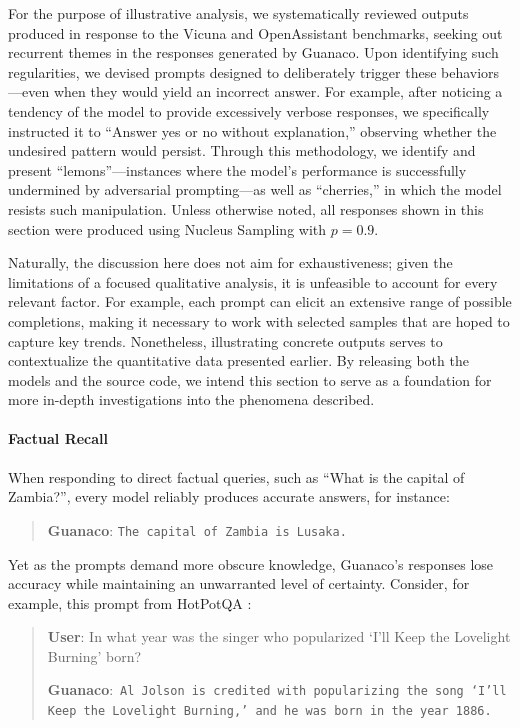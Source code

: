 For the purpose of illustrative analysis, we systematically reviewed outputs produced in response to the Vicuna and OpenAssistant benchmarks, seeking out recurrent themes in the responses generated by {Guanaco}. Upon identifying such regularities, we devised prompts designed to deliberately trigger these behaviors—even when they would yield an incorrect answer. For example, after noticing a tendency of the model to provide excessively verbose responses, we specifically instructed it to ``Answer yes or no without explanation,'' observing whether the undesired pattern would persist. Through this methodology, we identify and present ``lemons''—instances where the model's performance is successfully undermined by adversarial prompting—as well as ``cherries,'' in which the model resists such manipulation. Unless otherwise noted, all responses shown in this section were produced using Nucleus Sampling \cite{holtzmancurious} with $p=0.9$.

Naturally, the discussion here does not aim for exhaustiveness; given the limitations of a focused qualitative analysis, it is unfeasible to account for every relevant factor. For example, each prompt can elicit an extensive range of possible completions, making it necessary to work with selected samples that are hoped to capture key trends. Nonetheless, illustrating concrete outputs serves to contextualize the quantitative data presented earlier. By releasing both the models and the source code, we intend this section to serve as a foundation for more in-depth investigations into the phenomena described.

\paragraph{Factual Recall} When responding to direct factual queries, such as ``What is the capital of Zambia?'', every model reliably produces accurate answers, for instance:

\begin{quote} 
    \textbf{Guanaco}:
    \texttt{The capital of Zambia is Lusaka.}
\end{quote}

Yet as the prompts demand more obscure knowledge, {Guanaco}'s responses lose accuracy while maintaining an unwarranted level of certainty. Consider, for example, this prompt from HotPotQA \citep{yang2018hotpotqa}:

\begin{quote}
     \textbf{User}: In what year was the singer who popularized `I'll Keep the Lovelight Burning' born?  

     \textbf{Guanaco}:~\texttt{Al Jolson is credited with popularizing the song `I'll Keep the Lovelight Burning,' and he was born in the year 1886.}
 \end{quote}

